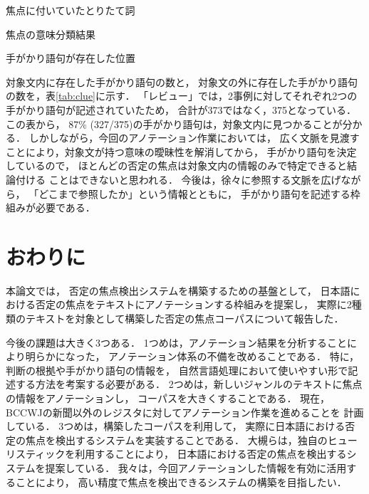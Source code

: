 \documentclass[japanese]{jnlp_1.4}
\begin{document}
\begin{table}[b]
\begin{minipage}[t]{0.48\hsize}
\caption{焦点に付いていたとりたて詞}
\label{tab:toritate}

\end{minipage}
\hfill
\begin{minipage}[t]{0.48\hsize}
\caption{焦点の意味分類結果}
\label{tab:semantic}

\end{minipage}
\end{table}
\begin{table}[b]
\caption{手がかり語句が存在した位置}
\label{tab:clue}

\end{table}

対象文内に存在した手がかり語句の数と，
対象文の外に存在した手がかり語句の数を，表\ref{tab:clue}に示す．
「レビュー」では，2事例に対してそれぞれ2つの手がかり語句が記述されていたため，
合計が373ではなく，375となっている．
この表から，
87\% (327/375)の手がかり語句は，対象文内に見つかることが分かる．
しかしながら，今回のアノテーション作業においては，
広く文脈を見渡すことにより，対象文が持つ意味の曖昧性を解消してから，
手がかり語句を決定しているので，
ほとんどの否定の焦点は対象文内の情報のみで特定できると結論付ける
ことはできないと思われる．
今後は，徐々に参照する文脈を広げながら，
「どこまで参照したか」という情報とともに，
手がかり語句を記述する枠組みが必要である．


\section{おわりに}

本論文では，
否定の焦点検出システムを構築するための基盤として，
日本語における否定の焦点をテキストにアノテーションする枠組みを提案し，
実際に2種類のテキストを対象として構築した否定の焦点コーパスについて報告した．

今後の課題は大きく3つある．
1つめは，アノテーション結果を分析することにより明らかになった，
アノテーション体系の不備を改めることである．
特に，判断の根拠や手がかり語句の情報を，
自然言語処理において使いやすい形で記述する方法を考案する必要がある．
2つめは，新しいジャンルのテキストに焦点の情報をアノテーションし，
コーパスを大きくすることである．
現在，
BCCWJの新聞以外のレジスタに対してアノテーション作業を進めることを
計画している．
3つめは，構築したコーパスを利用して，
実際に日本語における否定の焦点を検出するシステムを実装することである．
大槻らは，独自のヒューリスティックを利用することにより，
日本語における否定の焦点を検出するシステムを提案している\cite{otsuki2013}．
我々は，今回アノテーションした情報を有効に活用することにより，
高い精度で焦点を検出できるシステムの構築を目指したい．
\end{document}
